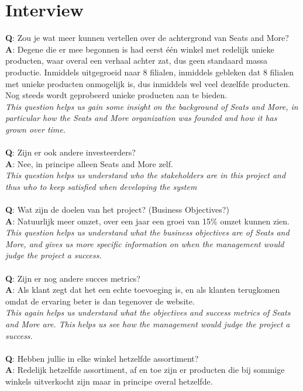 \documentclass[a4paper]{article}
\begin{document}
\section{Interview}
\textbf{Q}: Zou je wat meer kunnen vertellen over de achtergrond van Seats and More?
\textbf{A}: Degene die er mee begonnen is had eerst \'{e}\'{e}n winkel met redelijk unieke producten, waar overal een verhaal achter zat, dus geen standaard massa productie. Inmiddels uitgegroeid naar 8 filialen, inmiddels gebleken dat 8 filialen met unieke producten onmogelijk is, dus inmiddels wel veel dezelfde producten. Nog steeds wordt geprobeerd unieke producten aan te bieden.\\ 
\textit{This question helps us gain some insight on the background of \textit{Seats and More}, in particular how the \textit{Seats and More} organization was founded and how it has grown over time. }\\
\\
\textit{}
\textbf{Q}: Zijn er ook andere investeerders?\\
\textbf{A}: Nee, in principe alleen Seats and More zelf.\\
\textit{This question helps us understand who the stakeholders are in this project and thus who to keep satisfied when developing the system}\\
\\
\textbf{Q}: Wat zijn de doelen van het project? (Business Objectives?) \\
\textbf{A}: Natuurlijk meer omzet, over een jaar een groei van 15\% omzet kunnen zien.\\
\textit{This question helps us understand what the business objectives are of \textit{Seats and More}, and gives us more specific information on when the management would judge the project a success.}\\
\\
\textbf{Q}: Zijn er nog andere succes metrics?\\
\textbf{A}: Als klant zegt dat het een echte toevoeging is, en als klanten terugkomen omdat de ervaring beter is dan tegenover de website.\\
\textit{This again helps us understand what the objectives and success metrics of \textit{Seats and More} are. This helps us see how the management would judge the project a success.}\\
\\
\textbf{Q}: Hebben jullie in elke winkel hetzelfde assortiment?\\
\textbf{A}: Redelijk hetzelfde assortiment, af en toe zijn er producten die bij sommige winkels uitverkocht zijn maar in principe overal hetzelfde.\\
\end{document}
